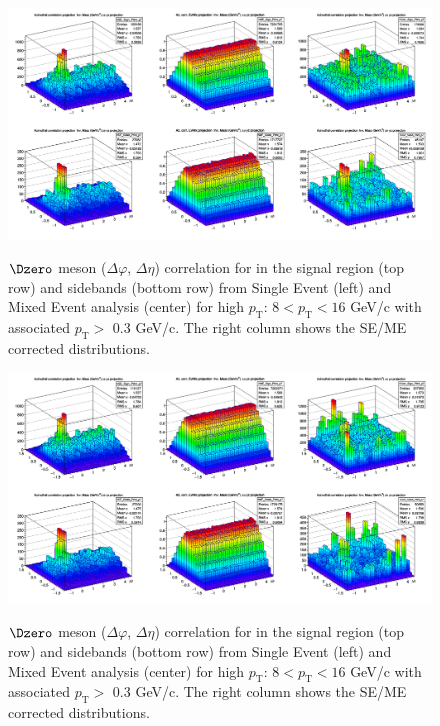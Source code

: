 \begin{figure}
\centering
{\includegraphics[width=1\linewidth]{figures/Dzero/Example_SE_ME_D0_Deta14.png}}
 \caption{$\Dzero$ meson ($\Delta\varphi$, $ \Delta\eta$) correlation for in the signal region (top row) and sidebands (bottom row) from  Single Event (left) and Mixed Event analysis (center) for high $p_\mathrm{T}$: $8 < p_\mathrm{T}<16$ GeV/c with associated $p_\mathrm{T} >$ 0.3 GeV/c. The right column shows the SE/ME corrected distributions.}
\label{fig:DzeroMElarge2}
\end{figure}

\begin{figure}
\centering
{\includegraphics[width=1\linewidth]{figures/Dzero/Example_SE_ME_D0_Deta16.png}}
 \caption{$\Dzero$ meson ($\Delta\varphi$, $ \Delta\eta$) correlation for in the signal region (top row) and sidebands (bottom row) from  Single Event (left) and Mixed Event analysis (center) for high $p_\mathrm{T}$: $8 < p_\mathrm{T}<16$ GeV/c with associated $p_\mathrm{T} >$ 0.3 GeV/c. The right column shows the SE/ME corrected distributions.}
\label{fig:DzeroMElarge3}
\end{figure}


